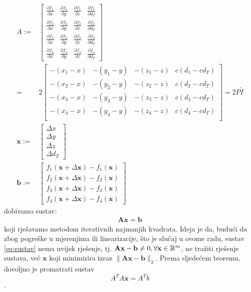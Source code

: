 \documentclass[a4paper,twoside,12pt]{memoir} %
\begin{document}
\begin{align}
A := & \begin{bmatrix}
\frac{\partial f_1}{\partial x} &
\frac{\partial f_1}{\partial y} &
\frac{\partial f_1}{\partial z} &
\frac{\partial f_1}{\partial d_T} \\
\frac{\partial f_2}{\partial x} &
\frac{\partial f_2}{\partial y} &
\frac{\partial f_2}{\partial z} &
\frac{\partial f_2}{\partial d_T} \\
\frac{\partial f_3}{\partial x} &
\frac{\partial f_3}{\partial y} &
\frac{\partial f_3}{\partial z} &
\frac{\partial f_3}{\partial d_T} \\
\frac{\partial f_4}{\partial x} &
\frac{\partial f_4}{\partial y} &
\frac{\partial f_4}{\partial z} &
\frac{\partial f_4}{\partial d_T}
\end{bmatrix} \\
= & 2\begin{bmatrix}
-(x_1-x) & -(y_1-y) & -(z_1-z) & c(d_1-cd_T) \\
-(x_2-x) & -(y_2-y) & -(z_2-z) & c(d_2-cd_T) \\ 
-(x_3-x) & -(y_3-y) & -(z_3-z) & c(d_3-cd_T) \\ 
-(x_4-x) & -(y_4-y) & -(z_4-z) & c(d_4-cd_T) \\
\end{bmatrix} = 2P \tilde{I}\\
\mathbf{x} := & \begin{bmatrix}
\Delta x \\
\Delta y \\
\Delta z \\
\Delta d_T
\end{bmatrix}\\
\mathbf{b} := &
\begin{bmatrix}
f_1(\mathbf{x} + \Delta\mathbf{x}) - f_1(\mathbf{x}) \\
f_2(\mathbf{x} + \Delta\mathbf{x}) - f_2(\mathbf{x}) \\
f_3(\mathbf{x} + \Delta\mathbf{x}) - f_3(\mathbf{x}) \\
f_4(\mathbf{x} + \Delta\mathbf{x}) - f_4(\mathbf{x})
\end{bmatrix}
\end{align}
dobivamo sustav:
\begin{align}\label{eq:sustav}
\mathbf{A}\mathbf{x} = \mathbf{b}
\end{align}
koji rješavamo metodom iterativnih najmanjih kvadrata.\label{stranica:nastavakLS}
Ideja je da, budući da zbog pogreške u mjerenjima ili linearizacije, što je slučaj u ovome radu, sustav \ref{eq:sustav} nema uvijek rješenje, tj. 
$\mathbf{A}\mathbf{x} - \mathbf{b} \not = 0, \forall \mathbf{x} \in \mathbb{R}^m$,
ne tražiti rješenje sustava, već $\mathbf{x}$ koji minimizira izraz $\|\mathbf{A}\mathbf{x} - \mathbf{b}\|_2$.
Prema sljedećem teoremu, dovoljno je promatrati sustav
$$ A^TA\mathbf{x} = A^Tb $$.
\end{document}
